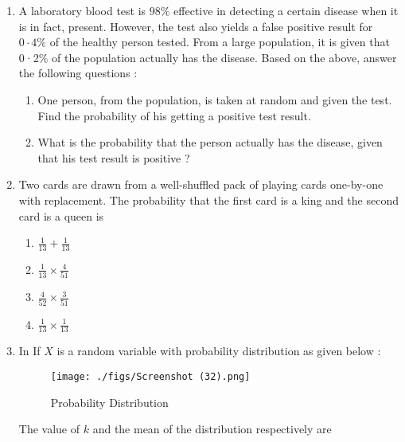 \documentclass{article}
\theoremstyle{remark}
\begin{document}
\begin{enumerate}[label=\arabic*.,ref=\theenumi]
\item A laboratory blood test is $98\%$ effective in detecting a certain 
disease when it is in fact, present. However, the test also yields 
a false positive result for $0·4\%$ of the healthy person tested. 
From a large population, it is given that 0·2$\%$ of the population 
actually has the disease. 
Based on the above, answer the following questions : 

  \begin{enumerate}[label=(\alph*)]
    
 \item One person, from the population, is taken at random and 
given the test. Find the probability of his getting a 
positive test result.  
 
 \item  What is the probability that the person actually has the 
disease, given that his test result is positive ?

\end{enumerate}

\item Two cards are drawn from a well-shuffled pack of playing 
cards one-by-one with replacement. The probability that the 
first card is a king and the second card is a queen is 

\begin{enumerate}[label=(\alph*)]
    
 \item $\frac{1}{13} + \frac{1}{13}$
 
 \item $\frac{1}{13} \times \frac{4}{51}$

 \item $\frac{4}{52} \times \frac{3}{51}$
 
 \item $\frac{1}{13} \times \frac{1}{13}$ 

\end{enumerate}

\item In  If $X$ is a random variable with probability distribution as given 
below :
\begin{figure}[H]
        \centering
        \texttt{[image: ./figs/Screenshot (32).png]}
        \caption{Probability Distribution}
        \label{fig:fig5.png}
    \end{figure}

The value of $k$ and the mean of the distribution respectively 
are


\end{enumerate}
\end{document}
